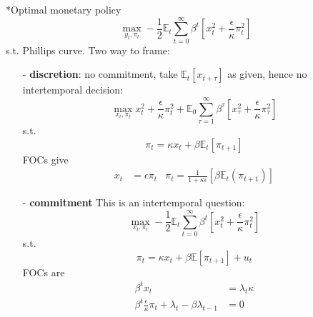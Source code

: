 \documentclass[10pt,a4paper]{article}
\makeatletter
\renewcommand{\subsection}{\@startsection{subsection}{1}{0mm}{.2ex}{.2ex}{\small\bfseries}}
\makeatother
\begin{document}
\begin{multicols*}{3}
\subsection*{Optimal monetary policy}
$$
\max_{y_t,\pi_t}-\frac{1}{2}\mathbb{E}_t\sum^{\infty}_{t=0}\beta^t\left[ x_t^2 + \frac{\epsilon}{\kappa} \pi_t^2 \right]
$$
s.t. Phillips curve. Two way to frame:
\begin{itemize}
    \item[-] \textbf{\color{myblue}discretion}: no commitment, take $\mathbb{E}_t[x_{t+\tau}]$ as given, hence no intertemporal decision:
    $$
    \max_{x_t,\pi_t}x_t^2+\frac{\epsilon}{\kappa}\pi_t^2 + \mathbb{E}_0\sum^{\infty}_{\tau=1}\beta^{\tau} \left[x_{\tau}^2+\frac{\epsilon}{\kappa}\pi_{\tau}^2\right]
    $$
    s.t.
    $$
    \pi_t = \kappa x_t +\beta\mathbb{E}_t[\pi_{t+1}]
    $$
    FOCs give
    \begin{align*}
        x_t &= \epsilon \pi_t & \pi_t = \frac{1}{1+\kappa\epsilon}[\beta\mathbb{E}_t(\pi_{t+1})]
    \end{align*} 
    
    \item[-] \textbf{\color{myblue}commitment}
This is an intertemporal question:
$$
\max_{x_t,\pi_t}-\frac{1}{2}\mathbb{E}_t\sum^{\infty}_{t=0}\beta^t\left[x_t^2 + \frac{\epsilon}{\kappa}\pi^2_t\right]
$$
s.t.
$$
\pi_t= \kappa x_t +\beta\mathbb{E}[\pi_{t+1}]+u_t
$$
FOCs are 
\begin{align*}
    \beta^t x_t &=\lambda_t \kappa\\
    \beta^t\frac{\epsilon}{\kappa}\pi_t +\lambda_t -\beta\lambda_{t-1} &=0
\end{align*}
\end{itemize}


\end{multicols*}
\end{document}
